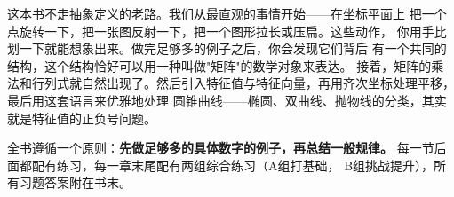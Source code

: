 \documentclass[a4paper,12pt]{ctexart}
\begin{document}
\newpage

\pagestyle{plain}


这本书不走抽象定义的老路。我们从最直观的事情开始——在坐标平面上
把一个点旋转一下，把一张图反射一下，把一个图形拉长或压扁。这些动作，
你用手比划一下就能想象出来。做完足够多的例子之后，你会发现它们背后
有一个共同的结构，这个结构恰好可以用一种叫做"矩阵"的数学对象来表达。
接着，矩阵的乘法和行列式就自然出现了。然后引入特征值与特征向量，再用齐次坐标处理平移，最后用这套语言来优雅地处理
圆锥曲线——椭圆、双曲线、抛物线的分类，其实就是特征值的正负号问题。

全书遵循一个原则：\textbf{先做足够多的具体数字的例子，再总结一般规律。}
每一节后面都配有练习，每一章末尾配有两组综合练习（A组打基础，
B组挑战提升），所有习题答案附在书末。

\newpage









\end{document}
